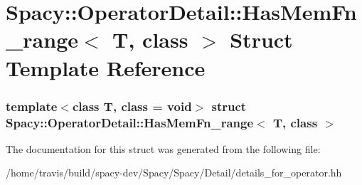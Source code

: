 \hypertarget{structSpacy_1_1OperatorDetail_1_1HasMemFn__range}{\section{\-Spacy\-:\-:\-Operator\-Detail\-:\-:\-Has\-Mem\-Fn\-\_\-range$<$ \-T, class $>$ \-Struct \-Template \-Reference}
\label{structSpacy_1_1OperatorDetail_1_1HasMemFn__range}
}
\subsubsection*{template$<$class T, class = void$>$ struct Spacy\-::\-Operator\-Detail\-::\-Has\-Mem\-Fn\-\_\-range$<$ T, class $>$}



\-The documentation for this struct was generated from the following file\-:\begin{DoxyCompactItemize}
\item 
/home/travis/build/spacy-\/dev/\-Spacy/\-Spacy/\-Detail/details\-\_\-for\-\_\-operator.\-hh\end{DoxyCompactItemize}
